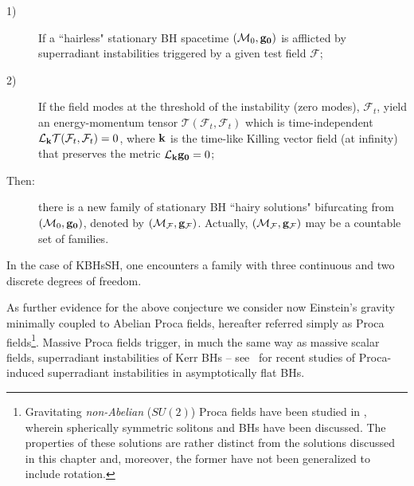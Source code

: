 \begin{description}
\item[1)] If a ``hairless" stationary BH spacetime $(\mathcal{M}_0,{\bf g_0})$ is afflicted by superradiant instabilities triggered by a given test field $\mathcal{F}$;
\item[2)] If the field modes at the threshold of the instability (zero modes), $\mathcal{F}_t$, yield an energy-momentum tensor $\mathcal{T}(\mathcal{F}_t,\mathcal{F}_t)$ which is time-independent $\mathcal{L}_{\bf k}\mathcal{T}(\mathcal{F}_t,\mathcal{F}_t)=0$, where ${\bf k}$ is the time-like Killing vector field (at infinity) that preserves the metric $\mathcal{L}_{\bf k}{\bf g_0}=0$;
\item[Then:] there is a new family of stationary BH ``hairy solutions" bifurcating from $(\mathcal{M}_0,{\bf g_0})$, denoted by $(\mathcal{M}_\mathcal{F},{\bf g_\mathcal{F}})$. Actually, $(\mathcal{M}_\mathcal{F},{\bf g_\mathcal{F}})$ may be a countable set of families.
\end{description}
In the case of KBHsSH, one encounters a family with three continuous and two discrete degrees of freedom.

As further evidence for the above conjecture we consider now 
Einstein's gravity minimally coupled to Abelian Proca fields, hereafter referred simply as Proca fields\footnote{Gravitating \textit{non-Abelian} ($SU(2)$) Proca fields have been studied in \cite{Greene:1992fw}, wherein spherically symmetric solitons and BHs have been discussed. The properties of these solutions are rather distinct from the solutions discussed in this chapter and, moreover, the former have not been generalized to include rotation.}. 
Massive Proca fields trigger, in much the same way as massive scalar fields, 
superradiant instabilities of Kerr BHs -- see~\cite{Pani:2012vp,Pani:2012bp,Witek:2012tr} 
for recent studies of Proca-induced superradiant instabilities in asymptotically flat BHs. 


